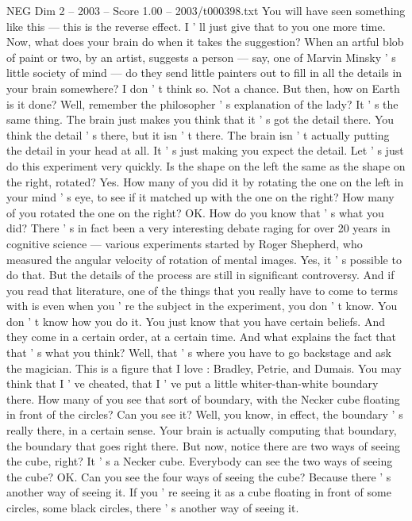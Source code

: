 \begin{textsample}{NEG Dim 2 – 2003 – Score 1.00 – 2003/t000398.txt}
You will have seen something like this — this is the reverse effect.
I ' ll just give that to you one more time.
Now, what does your brain do when it takes the suggestion?
When an artful blob of paint or two, by an artist, suggests a person — say, one of Marvin Minsky ' s little society of mind — do they send little painters out to fill in all the details in your brain somewhere?
I don ' t think so.
Not a chance.
But then, how on Earth is it done?
Well, remember the philosopher ' s explanation of the lady?
It ' s the same thing.
The brain just makes you think that it ' s got the detail there.
You think the detail ' s there, but it isn ' t there.
The brain isn ' t actually putting the detail in your head at all.
It ' s just making you expect the detail.
Let ' s just do this experiment very quickly.
Is the shape on the left the same as the shape on the right, rotated?
Yes.
How many of you did it by rotating the one on the left in your mind ' s eye, to see if it matched up with the one on the right?
How many of you rotated the one on the right?
OK.
How do you know that ' s what you did?
There ' s in fact been a very interesting debate raging for over 20 years in cognitive science — various experiments started by Roger Shepherd, who measured the angular velocity of rotation of mental images.
Yes, it ' s possible to do that.
But the details of the process are still in significant controversy.
And if you read that literature, one of the things that you really have to come to terms with is even when you ' re the subject in the experiment, you don ' t know.
You don ' t know how you do it.
You just know that you have certain beliefs.
And they come in a certain order, at a certain time.
And what explains the fact that that ' s what you think?
Well, that ' s where you have to go backstage and ask the magician.
This is a figure that I love : Bradley, Petrie, and Dumais.
You may think that I ' ve cheated, that I ' ve put a little whiter-than-white boundary there.
How many of you see that sort of boundary, with the Necker cube floating in front of the circles?
Can you see it?
Well, you know, in effect, the boundary ' s really there, in a certain sense.
Your brain is actually computing that boundary, the boundary that goes right there.
But now, notice there are two ways of seeing the cube, right?
It ' s a Necker cube.
Everybody can see the two ways of seeing the cube?
OK.
Can you see the four ways of seeing the cube?
Because there ' s another way of seeing it.
If you ' re seeing it as a cube floating in front of some circles, some black circles, there ' s another way of seeing it.

\end{textsample}
